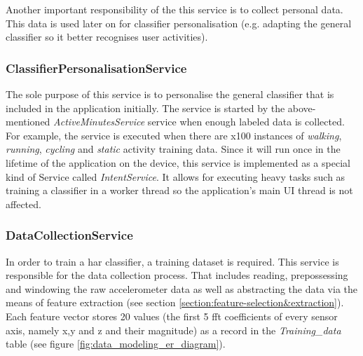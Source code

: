             Another important responsibility of the this service is to collect personal data. This data is used later on for classifier personalisation (e.g. adapting the general classifier so it better recognises user activities).
            
            \subsubsection{ClassifierPersonalisationService}
            \label{section:classifier-personal-service}
            The sole purpose of this service is to personalise the general classifier that is included in the application initially. The service is started by the above-mentioned \textit{ActiveMinutesService} service when enough labeled data is collected. For example, the service is executed when there are x100 instances of \textit{walking}, \textit{running}, \textit{cycling} and \textit{static} activity training data. Since it will run once in the lifetime of the application on the device, this service is implemented as a special kind of Service called \textit{IntentService}. It allows for executing heavy tasks such as training a classifier in a worker thread so the application's main UI thread is not affected.
            
            \subsubsection{DataCollectionService}
            \label{section:data_collection_service}
            In order to train a \gls{har} classifier, a training dataset is required. This service is responsible for the data collection process. That includes reading, prepossessing and windowing the raw accelerometer data as well as abstracting the data via the means of feature extraction (see section \ref{section:feature-selection&extraction}). Each feature vector stores 20 values (the first 5 \gls{fft} coefficients of every sensor axis, namely x,y and z and their magnitude) as a record in the \textit{Training\_data} table (see figure \ref{fig:data_modeling_er_diagram}).
            

